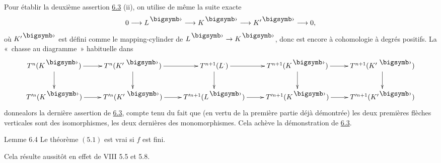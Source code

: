 \documentclass[10pt]{../fichiers-configuration-latex/smfart}
\begin{document}
Pour établir la deuxième assertion \hyperref[XII.cor6.3]{6.3} (ii), on utilise de même la
suite exacte
$$
0\longrightarrow L^{\bigdot}\longrightarrow K^{\bigdot}\longrightarrow
K'^{\bigdot}\longrightarrow 0{\quoi},
$$
où $K'^{\bigdot}$ est défini comme le mapping-cylinder de
$L^{\bigdot}\rightarrow K^{\bigdot}$, donc est encore à cohomologie à
degrés positifs. La « chasse au diagramme »  habituelle dans
$$
\xymatrix{
T^{n}(K^{\bigdot})  \ar[r] \ar[d]& T^{n}(K'^{\;\bigdot})  \ar[r] \ar[d]& T^{n+1}
(L^{\cdot})  \ar[r]\ar[d] & {T^{n+1}(K^{\bigdot})}  \ar[r]
\ar[d]&{T^{n+1}(K'^{\;\bigdot})} \ar[d]\\
T'^{n}(K^{\bigdot}) \ar[r] & T'^{n}(K'^{\;\bigdot})  \ar[r] &
T'^{n+1}(L^{\bigdot}) \ar[r] & T'^{n+1}(K^{\bigdot}) \ar[r] & T'^{n+1}(K'^{\bigdot})
}
$$
donne\pageoriginale alors la dernière assertion de \hyperref[XII.cor6.3]{6.3}, compte tenu du
fait que (en vertu de la première partie déjà démontrée) les deux
premières flèches verticales sont des isomorphismes, les deux
dernières des monomorphismes. Cela achève la démonstration de \hyperref[XII.cor6.3]{6.3}.

\begin{enonce*}{Lemme 6.4}
Le théorème $(5.1)$ est vrai si $f$ est fini.
\end{enonce*}

Cela résulte aussitôt en effet de VIII 5.5 et 5.8.
\end{document}
